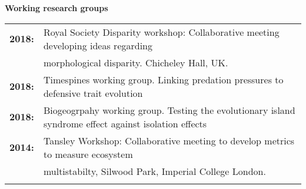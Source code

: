 \documentclass[10pt,a4paper]{article}
\begin{document}
\begin{flushleft}
\raggedright\textbf{Working research groups}\\
\begin{tabular}{ll}
\textbf{2018:} & Royal Society Disparity workshop: Collaborative meeting developing ideas regarding\\ 
&morphological disparity. Chicheley Hall, UK.\\

\textbf{2018:} & Timespines working group. Linking predation pressures to defensive trait evolution\\ 
\textbf{2018:} & Biogeogrpahy working group. Testing the evolutionary island syndrome effect against isolation effects \\ 



\textbf{2014:} & Tansley Workshop: Collaborative meeting to develop metrics to measure ecosystem\\
&multistabilty, Silwood Park, Imperial College London.\\

&\\
\end{tabular}




\end{flushleft}









\end{document}
